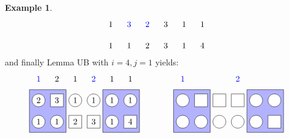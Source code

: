 \documentclass[reqno]{amsart}
\newcommand{\0}{\phantom{c}}
\theoremstyle{plain}
\theoremstyle{definition}
\newtheorem{example}[thm]{Example}
\numberwithin{equation}{section}
\begin{document}
\begin{example}
\[\begin{tikzpicture}[scale=0.9]
  \node[blue] at (2*\sc,\ll) {$3$};
  \node[blue] at (3*\sc,\ll) {$2$};
  \foreach \i in {1,5,6} { \node at (\i*\sc,\ll) {$1$}; }
  \foreach \i in {4} { \node at (\i*\sc,\ll) {$3$}; }
  \foreach \i in {1,2,5} { \node at (\i*\sc,\l) {$1$}; }
  \foreach \i in {3} { \node at (\i*\sc,\l) {$2$}; }
  \foreach \i in {4} { \node at (\i*\sc,\l) {$3$}; }
  \foreach \i in {6} { \node at (\i*\sc,\l) {$4$}; }
\end{tikzpicture}
\]
and finally Lemma UB with $i=4, j=1$ yields:
\[
\begin{tikzpicture}[scale=0.9]
  \def\sc{0.85}   %
  \def\lll{3}  %
  \def\ll{2}   %
  \def\l{1}   %
  \draw[fill=blue!30] (0.5*\sc,\l-.5) rectangle(2.5*\sc,\ll+.5);
  \draw[fill=blue!30] (4.5*\sc,\l-.5) rectangle(6.5*\sc,\ll+.5);
  \foreach \i in {1,3,4,5,6} { \draw[fill=white] (\i*\sc,\ll) circle (0.3); }
  \foreach \i in {2} { \draw[fill=white] (\i*\sc-.3,\ll-.3) rectangle +(0.6,+0.6); }
  \foreach \i in {1,2,5} { \draw[fill=white] (\i*\sc,\l) circle (0.3); }
  \foreach \i in {3,4,6} { \draw[fill=white] (\i*\sc-.3,\l-.3) rectangle +(0.6,+0.6); }
  \node[blue] at (4*\sc,\lll) {$2$};
  \node[blue] at (1*\sc,\lll) {$1$};
  \foreach \i in {3,5,6} { \node at (\i*\sc,\lll) {$1$}; }
  \foreach \i in {2} { \node at (\i*\sc,\lll) {$2$}; }
  \foreach \i in {3,4,5,6} { \node at (\i*\sc,\ll) {$1$}; }
  \foreach \i in {1} { \node at (\i*\sc,\ll) {$2$}; }
  \foreach \i in {2} { \node at (\i*\sc,\ll) {$3$}; }
  \foreach \i in {1,2,5} { \node at (\i*\sc,\l) {$1$}; }
  \foreach \i in {3} { \node at (\i*\sc,\l) {$2$}; }
  \foreach \i in {4} { \node at (\i*\sc,\l) {$3$}; }
  \foreach \i in {6} { \node at (\i*\sc,\l) {$4$}; }
\end{tikzpicture}
\hspace{40pt}
\begin{tikzpicture}[scale=0.9]
  \def\sc{0.85}   %
  \def\lll{3}  %
  \def\ll{2}   %
  \def\l{1}   %
  \draw[fill=blue!30] (0.5*\sc,\l-.5) rectangle(2.5*\sc,\ll+.5);
  \draw[fill=blue!30] (4.5*\sc,\l-.5) rectangle(6.5*\sc,\ll+.5);
  \foreach \i in {1,5,6} { \draw[fill=white] (\i*\sc,\ll) circle (0.3); }
  \foreach \i in {2,3,4} { \draw[fill=white] (\i*\sc-.3,\ll-.3) rectangle +(0.6,+0.6); }
  \foreach \i in {1,2,3,4,5} { \draw[fill=white] (\i*\sc,\l) circle (0.3); }
  \foreach \i in {6} { \draw[fill=white] (\i*\sc-.3,\l-.3) rectangle +(0.6,+0.6); }
  \node[blue] at (4*\sc,\lll) {$2$};
  \node[blue] at (1*\sc,\lll) {$1$};

\end{tikzpicture}\]
\end{example}
\end{document}
